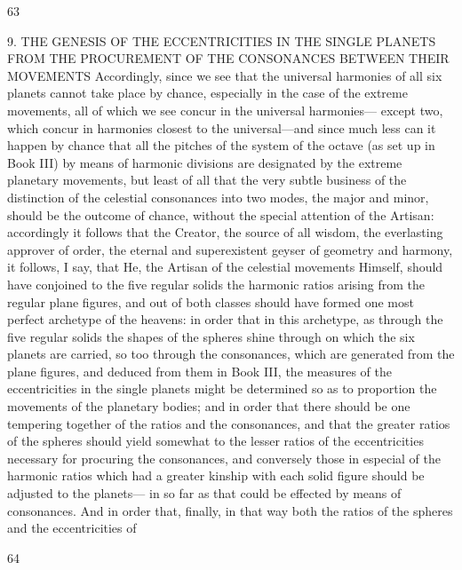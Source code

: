 \documentclass{article}
\begin{document}
63

9. THE GENESIS OF THE ECCENTRICITIES IN THE
SINGLE PLANETS FROM THE PROCUREMENT OF
THE CONSONANCES BETWEEN THEIR
MOVEMENTS
Accordingly, since we see that the universal harmonies of all six planets
cannot take place by chance, especially in the case of the extreme
movements, all of which we see concur in the universal harmonies—
except two, which concur in harmonies closest to the universal—and
since much less can it happen by chance that all the pitches of the system
of the octave (as set up in Book III) by means of harmonic divisions are
designated by the extreme planetary movements, but least of all that the
very subtle business of the distinction of the celestial consonances into
two modes, the major and minor, should be the outcome of chance,
without the special attention of the Artisan: accordingly it follows that
the Creator, the source of all wisdom, the everlasting approver of order,
the eternal and superexistent geyser of geometry and harmony, it
follows, I say, that He, the Artisan of the celestial movements Himself,
should have conjoined to the five regular solids the harmonic ratios
arising from the regular plane figures, and out of both classes should
have formed one most perfect archetype of the heavens: in order that in
this archetype, as through the five regular solids the shapes of the
spheres shine through on which the six planets are carried, so too
through the consonances, which are generated from the plane figures,
and deduced from them in Book III, the measures of the eccentricities in
the single planets might be determined so as to proportion the
movements of the planetary bodies; and in order that there should be
one tempering together of the ratios and the consonances, and that the
greater ratios of the spheres should yield somewhat to the lesser ratios of
the eccentricities necessary for procuring the consonances, and
conversely those in especial of the harmonic ratios which had a greater
kinship with each solid figure should be adjusted to the planets— in so
far as that could be effected by means of consonances. And in order that,
finally, in that way both the ratios of the spheres and the eccentricities of


64
\end{document}
